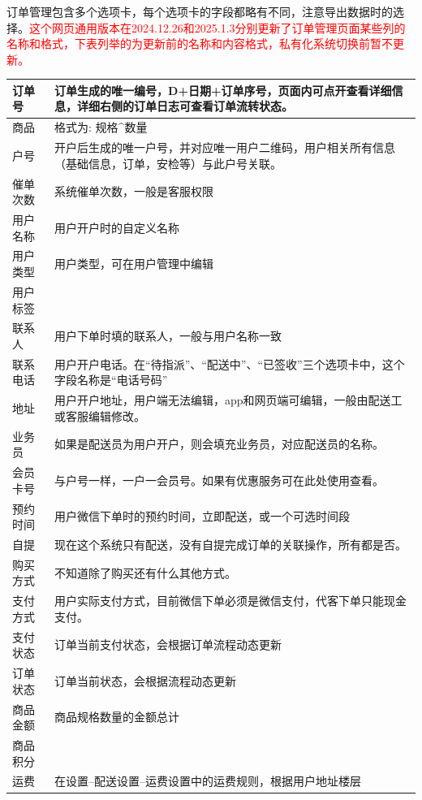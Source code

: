 \documentclass[UTF8]{ctexart}
\begin{document}
订单管理包含多个选项卡，每个选项卡的字段都略有不同，注意导出数据时的选择。\textcolor{red}{这个网页通用版本在2024.12.26和2025.1.3分别更新了订单管理页面某些列的名称和格式，下表列举的为更新前的名称和内容格式，私有化系统切换前暂不更新。}

\begin{longtable}[h!]{ | m{3cm} | m{12cm} | } 

		\hline
		订单号 & 订单生成的唯一编号，D+日期+订单序号，页面内可点开查看详细信息，详细右侧的订单日志可查看订单流转状态。\\
		\hline
		商品 & 格式为: 规格\^{}数量\\
		\hline
		户号 & 开户后生成的唯一户号，并对应唯一用户二维码，用户相关所有信息（基础信息，订单，安检等）与此户号关联。\\
		\hline
		催单次数 & 系统催单次数，一般是客服权限\\
		\hline
		用户名称& 用户开户时的自定义名称\\
		\hline
		用户类型& 用户类型，可在用户管理中编辑\\
		\hline
		用户标签& \\
		\hline
		联系人& 用户下单时填的联系人，一般与用户名称一致\\
		\hline
		联系电话& 用户开户电话。在“待指派”、“配送中”、“已签收”三个选项卡中，这个字段名称是“电话号码”\\
		\hline
		地址& 用户开户地址，用户端无法编辑，app和网页端可编辑，一般由配送工或客服编辑修改。 \\
		\hline
		业务员& 如果是配送员为用户开户，则会填充业务员，对应配送员的名称。\\
		\hline
		会员卡号& 与户号一样，一户一会员号。如果有优惠服务可在此处使用查看。\\
		\hline
		预约时间& 用户微信下单时的预约时间，立即配送，或一个可选时间段\\
		\hline
		自提& 现在这个系统只有配送，没有自提完成订单的关联操作，所有都是否。\\
		\hline
		购买方式& 不知道除了购买还有什么其他方式。 \\
		\hline
		支付方式& 用户实际支付方式，目前微信下单必须是微信支付，代客下单只能现金支付。\\
		\hline
		支付状态& 订单当前支付状态，会根据订单流程动态更新\\
		\hline
		订单状态& 订单当前状态，会根据流程动态更新\\
		\hline
		商品金额& 商品规格数量的金额总计 \\
		\hline
		商品积分& \\
		\hline
		运费& 在设置--配送设置--运费设置中的运费规则，根据用户地址楼层\\

\end{longtable}
\end{document}
